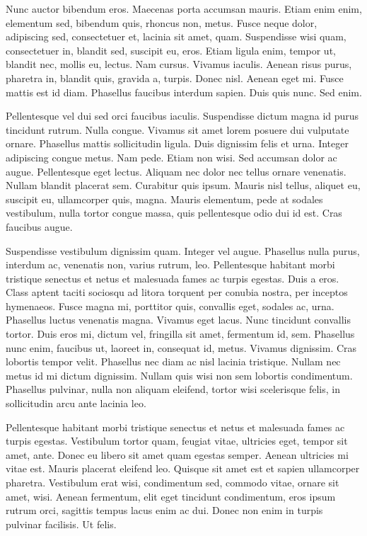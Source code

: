 Nunc auctor bibendum eros. Maecenas porta accumsan mauris. Etiam enim enim, elementum sed, bibendum quis, rhoncus non, metus. Fusce neque dolor, adipiscing sed, consectetuer et, lacinia sit amet, quam. Suspendisse wisi quam, consectetuer in, blandit sed, suscipit eu, eros. Etiam ligula enim, tempor ut, blandit nec, mollis eu, lectus. Nam cursus. Vivamus iaculis. Aenean risus purus, pharetra in, blandit quis, gravida a, turpis. Donec nisl. Aenean eget mi. Fusce mattis est id diam. Phasellus faucibus interdum sapien. Duis quis nunc. Sed enim.

Pellentesque vel dui sed orci faucibus iaculis. Suspendisse dictum magna id purus tincidunt rutrum. Nulla congue. Vivamus sit amet lorem posuere dui vulputate ornare. Phasellus mattis sollicitudin ligula. Duis dignissim felis et urna. Integer adipiscing congue metus. Nam pede. Etiam non wisi. Sed accumsan dolor ac augue. Pellentesque eget lectus. Aliquam nec dolor nec tellus ornare venenatis. Nullam blandit placerat sem. Curabitur quis ipsum. Mauris nisl tellus, aliquet eu, suscipit eu, ullamcorper quis, magna. Mauris elementum, pede at sodales vestibulum, nulla tortor congue massa, quis pellentesque odio dui id est. Cras faucibus augue.

Suspendisse vestibulum dignissim quam. Integer vel augue. Phasellus nulla purus, interdum ac, venenatis non, varius rutrum, leo. Pellentesque habitant morbi tristique senectus et netus et malesuada fames ac turpis egestas. Duis a eros. Class aptent taciti sociosqu ad litora torquent per conubia nostra, per inceptos hymenaeos. Fusce magna mi, porttitor quis, convallis eget, sodales ac, urna. Phasellus luctus venenatis magna. Vivamus eget lacus. Nunc tincidunt convallis tortor. Duis eros mi, dictum vel, fringilla sit amet, fermentum id, sem. Phasellus nunc enim, faucibus ut, laoreet in, consequat id, metus. Vivamus dignissim. Cras lobortis tempor velit. Phasellus nec diam ac nisl lacinia tristique. Nullam nec metus id mi dictum dignissim. Nullam quis wisi non sem lobortis condimentum. Phasellus pulvinar, nulla non aliquam eleifend, tortor wisi scelerisque felis, in sollicitudin arcu ante lacinia leo.

Pellentesque habitant morbi tristique senectus et netus et malesuada fames ac turpis egestas. Vestibulum tortor quam, feugiat vitae, ultricies eget, tempor sit amet, ante. Donec eu libero sit amet quam egestas semper. Aenean ultricies mi vitae est. Mauris placerat eleifend leo. Quisque sit amet est et sapien ullamcorper pharetra. Vestibulum erat wisi, condimentum sed, commodo vitae, ornare sit amet, wisi. Aenean fermentum, elit eget tincidunt condimentum, eros ipsum rutrum orci, sagittis tempus lacus enim ac dui. Donec non enim in turpis pulvinar facilisis. Ut felis.

